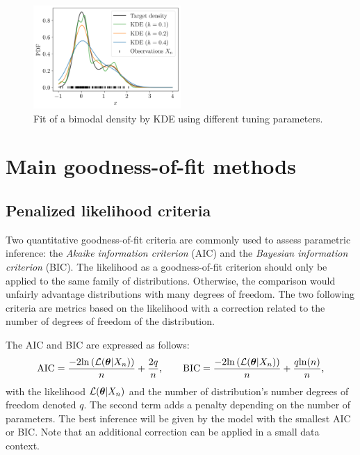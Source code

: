 \begin{figure}[H]
    \centering
    \includegraphics[width=0.5\textwidth]{../numerical_experiments/chapter1/figures/KDE.png}
    \caption{Fit of a bimodal density by KDE using different tuning parameters.}
    \label{fig:KDE}
\end{figure}


\section*{Main goodness-of-fit methods}

\subsection*{Penalized likelihood criteria}
Two quantitative goodness-of-fit criteria are commonly used to assess parametric inference: the \textit{Akaike information criterion} (AIC) and the \textit{Bayesian information criterion} (BIC). 
The likelihood as a goodness-of-fit criterion should only be applied to the same family of distributions. 
Otherwise, the comparison would unfairly advantage distributions with many degrees of freedom.
The two following criteria are metrics based on the likelihood with a correction related to the number of degrees of freedom of the distribution. 

The AIC and BIC are expressed as follows:
\begin{equation}
    \textrm{AIC} = \frac{-2 \mathrm{ln}\left(\mathcal{L}({\boldsymbol{\theta}}|X_n)\right)}{n} + \frac{2 q}{n},\qquad
    \textrm{BIC} = \frac{-2 \mathrm{ln}\left(\mathcal{L}({\boldsymbol{\theta}}|X_n)\right)}{n} + \frac{q \mathrm{ln}(n)}{n},
\end{equation}
with the likelihood $\mathcal{L}({\boldsymbol{\theta}}|X_n)$ and the number of distribution's number degrees of freedom denoted $q$.
The second term adds a penalty depending on the number of parameters. 
The best inference will be given by the model with the smallest AIC or BIC. 
Note that an additional correction can be applied in a small data context.

